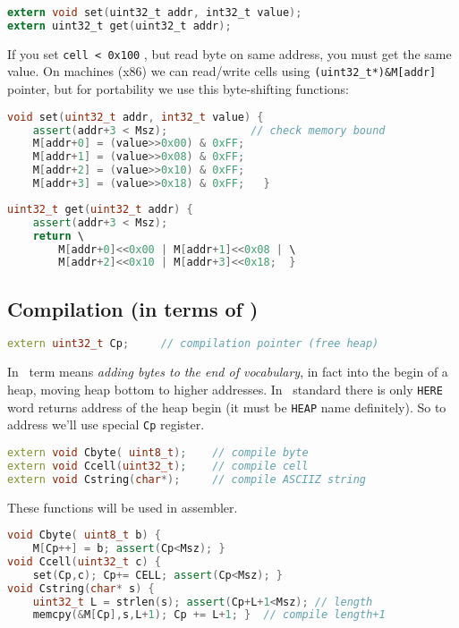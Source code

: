 \begin{lstlisting}[language=C]
extern void set(uint32_t addr, int32_t value);
extern uint32_t get(uint32_t addr);
\end{lstlisting}

If you set \verb|cell < 0x100| , but read byte on same address, you must get the
same value. On  machines (x86) we can read/write cells using
\verb|(uint32_t*)&M[addr]| pointer, but for portability we use this
byte-shifting functions:

\begin{lstlisting}[language=C++]
void set(uint32_t addr, int32_t value) {
	assert(addr+3 < Msz);			  // check memory bound
	M[addr+0] = (value>>0x00) & 0xFF;
	M[addr+1] = (value>>0x08) & 0xFF;
	M[addr+2] = (value>>0x10) & 0xFF;
	M[addr+3] = (value>>0x18) & 0xFF;	}
\end{lstlisting}
\begin{lstlisting}[language=C++]
uint32_t get(uint32_t addr) {
	assert(addr+3 < Msz);
	return \
		M[addr+0]<<0x00 | M[addr+1]<<0x08 | \
		M[addr+2]<<0x10 | M[addr+3]<<0x18;	}
\end{lstlisting}

\subsection{Compilation (in terms of \F)}

\begin{lstlisting}[language=C++]
extern uint32_t Cp;		// compilation pointer (free heap)
\end{lstlisting}

In \F\ term  means \textit{adding bytes to the end of
vocabulary}, in fact into the begin of a heap, moving heap bottom to higher
addresses. In \F\ standard there is only \verb|HERE| word returns address of
the heap begin (it must be \verb|HEAP| name definitely). So to address we'll use
special \verb|Cp| register.\label{Fheap}

\begin{lstlisting}[language=C++]
extern void Cbyte( uint8_t);	// compile byte
extern void Ccell(uint32_t);	// compile cell
extern void Cstring(char*);		// compile ASCIIZ string
\end{lstlisting}

\noindent
These functions will be used in assembler.
\bigskip

\label{Cxxx}
\begin{lstlisting}[language=C++]
void Cbyte( uint8_t b) {
	M[Cp++] = b; assert(Cp<Msz); }
void Ccell(uint32_t c) {
	set(Cp,c); Cp+= CELL; assert(Cp<Msz); }
void Cstring(char* s) {
	uint32_t L = strlen(s); assert(Cp+L+1<Msz);	// length
	memcpy(&M[Cp],s,L+1); Cp += L+1; }	// compile length+1
\end{lstlisting}

